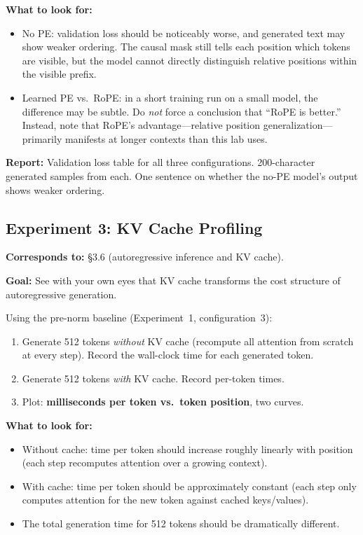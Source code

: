 \textbf{What to look for:}
\begin{itemize}[nosep]
    \item No PE: validation loss should be noticeably worse, and generated text may show weaker ordering. The causal mask still tells each position which tokens are visible, but the model cannot directly distinguish relative positions within the visible prefix.
    \item Learned PE vs.\ RoPE: in a short training run on a small model, the difference may be subtle. Do \emph{not} force a conclusion that ``RoPE is better.'' Instead, note that RoPE's advantage---relative position generalization---primarily manifests at longer contexts than this lab uses.
\end{itemize}

\textbf{Report:} Validation loss table for all three configurations. 200-character generated samples from each. One sentence on whether the no-PE model's output shows weaker ordering.

\subsection*{Experiment 3: KV Cache Profiling}

\textbf{Corresponds to:} \S3.6 (autoregressive inference and KV cache).

\textbf{Goal:} See with your own eyes that KV cache transforms the cost structure of autoregressive generation.

Using the pre-norm baseline (Experiment~1, configuration~3):

\begin{enumerate}[nosep]
    \item Generate 512 tokens \emph{without} KV cache (recompute all attention from scratch at every step). Record the wall-clock time for each generated token.
    \item Generate 512 tokens \emph{with} KV cache. Record per-token times.
    \item Plot: \textbf{milliseconds per token vs.\ token position}, two curves.
\end{enumerate}

\textbf{What to look for:}
\begin{itemize}[nosep]
    \item Without cache: time per token should increase roughly linearly with position (each step recomputes attention over a growing context).
    \item With cache: time per token should be approximately constant (each step only computes attention for the new token against cached keys/values).
    \item The total generation time for 512 tokens should be dramatically different.
\end{itemize}

